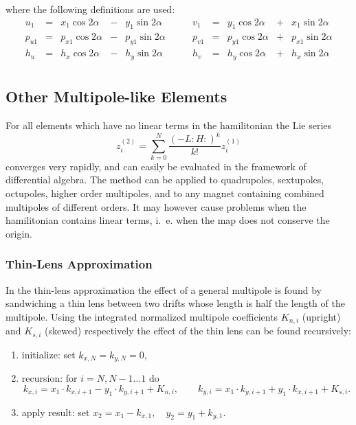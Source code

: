 \documentclass{report}
\newcommand{\lieop}[1]
{{:}{#1}{:}}
\begin{document}
where the following definitions are used:
\begin{equation}
  \begin{array}{lclcllclcl}
    u_1 &=& x_1 \cos 2 \alpha &-& y_1 \sin 2 \alpha \qquad &
    v_1 &=& y_1 \cos 2 \alpha &+& x_1 \sin 2 \alpha \\
    p_{u1} &=& p_{x1} \cos 2 \alpha &-& p_{y1} \sin 2 \alpha \qquad &
    p_{v1} &=& p_{y1} \cos 2 \alpha &+& p_{x1} \sin 2 \alpha \\
    h_u &=& h_x \cos 2 \alpha &-& h_y \sin 2 \alpha \qquad &
    h_v &=& h_y \cos 2 \alpha &+& h_x \sin 2 \alpha \\
  \end{array}
\end{equation}


\clearpage
\subsection{Other Multipole-like Elements}
\label{sec:multi}
For all elements which have no linear terms in the hamilitonian the Lie
series
\begin{equation}
  z_i^{(2)} = \sum_{k=0}^N \frac{(-L \lieop{H})^k}{k!} z_i^{(1)}
\end{equation}
converges very rapidly,
and can easily be evaluated in the framework of differential algebra.
The method can be applied to quadrupoles, sextupoles, octupoles, higher
order multipoles, and to any magnet containing combined multipoles of
different orders. 
It may however cause problems when the hamilitonian contains linear
terms, i.~e. when the map does not conserve the origin.

\subsubsection{Thin-Lens Approximation}
\label{thinlens}
In the thin-lens approximation the effect of a general multipole is found by
sandwiching a thin lens between two drifts whose length is half the length
of the multipole. 
Using the integrated normalized multipole coefficients $K_{n,i}$
(upright) and $K_{s,i}$ (skewed) respectively the effect of the thin
lens can be found recursively:
\begin{enumerate}
\item initialize: set $k_{x,N} = k_{y,N} = 0$,
\item recursion: for $i = N, N-1 \ldots 1$ do
\[
k_{x,i} = x_1 \cdot k_{x,i+1} - y_1 \cdot k_{y,i+1} + K_{n,i}, \qquad
k_{y,i} = x_1 \cdot k_{y,i+1} + y_1 \cdot k_{x,i+1} + K_{s,i}.
\]
\item apply result: set $x_2 = x_1 - k_{x,1}, \quad y_2 = y_1 + k_{y,1}$.
\end{enumerate}
\end{document}
